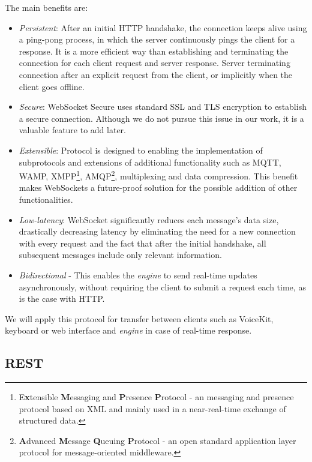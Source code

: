 The main benefits are:

\begin{itemize}
	\item \textit{Persistent}: After an initial HTTP handshake, the connection keeps alive using a ping-pong process, in which the server continuously pings the client for a response. It is a more efficient way than establishing and terminating the connection for each client request and server response. Server terminating connection after an explicit request from the client, or implicitly when the client goes offline.
	\item \textit{Secure}: WebSocket Secure uses standard SSL and TLS encryption to establish a secure connection. Although we do not pursue this issue in our work, it is a valuable feature to add later.
	\item \textit{Extensible}: Protocol is designed to enabling the implementation of subprotocols and extensions of additional functionality such as MQTT, WAMP, XMPP\footnote{E\textbf{x}tensible \textbf{M}essaging and \textbf{P}resence \textbf{P}rotocol - an messaging and presence protocol based on XML and mainly used in a near-real-time exchange of structured data.}, AMQP\footnote{\textbf{A}dvanced \textbf{M}essage \textbf{Q}ueuing \textbf{P}rotocol - an open standard application layer protocol for message-oriented middleware.}, multiplexing and data compression. This benefit makes WebSockets a future-proof solution for the possible addition of other functionalities.
	\item \textit{Low-latency}: WebSocket significantly reduces each message's data size, drastically decreasing latency by eliminating the need for a new connection with every request and the fact that after the initial handshake, all subsequent messages include only relevant information.
	\item \textit{Bidirectional} - This enables the \textit{engine} to send real-time updates asynchronously, without requiring the client to submit a request each time, as is the case with HTTP. 
\end{itemize}

We will apply this protocol for transfer between clients such as VoiceKit, keyboard or web interface and \textit{engine} in case of real-time response.

\subsection{REST}

